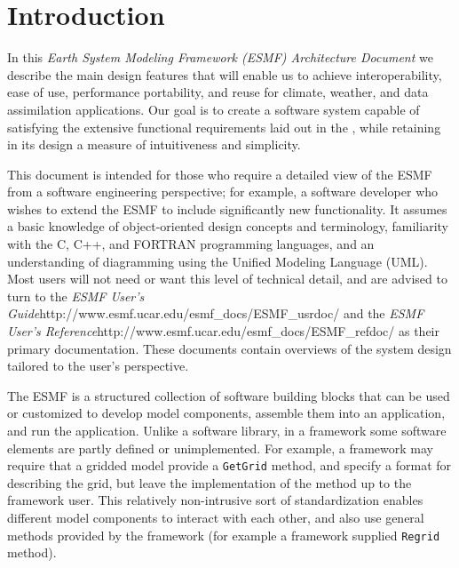 \section{Introduction}
\label{sec:intro}

In this {\it Earth System Modeling Framework (ESMF) Architecture Document} we describe 
the main design features that will enable us to achieve interoperability, ease of 
use, performance portability, and reuse for climate, weather, and data assimilation
applications.  Our goal is to create a software system capable of satisfying
the extensive functional requirements laid out in the  
\cite{bib:ESMFreqdoc}, while retaining in its design a measure of intuitiveness 
and simplicity. 

This document is intended for those who require a detailed view of the ESMF
from a software engineering perspective; for example, a software developer who
wishes to extend the ESMF to include significantly new functionality.  It assumes 
a basic knowledge of object-oriented design concepts and terminology, familiarity 
with the C, C++, and FORTRAN programming languages, and an understanding of 
diagramming using the Unified Modeling Language (UML).  Most users will 
not need or want this level of technical detail, and are advised to turn to 
the {\it ESMF User's Guide}{http://www.esmf.ucar.edu/esmf\_docs/ESMF\_usrdoc/} 
and the {\it ESMF User's Reference}{http://www.esmf.ucar.edu/esmf\_docs/ESMF\_refdoc/} 
as their primary documentation.  These documents contain overviews of the system 
design tailored to the user's perspective.

The ESMF is a structured collection of software building blocks 
that can be used or customized to develop model components, assemble them into an 
application, and run the application.  Unlike a software library, in a framework some
software elements are partly defined or unimplemented.  For example, a framework
may require that a gridded model provide a {\tt GetGrid} method, and specify 
a format for describing the grid, but leave the implementation of the method up
to the framework user.  This relatively non-intrusive sort of standardization enables 
different model components to interact with each other, and also
use general methods provided by the framework (for example a framework supplied
{\tt Regrid} method).

